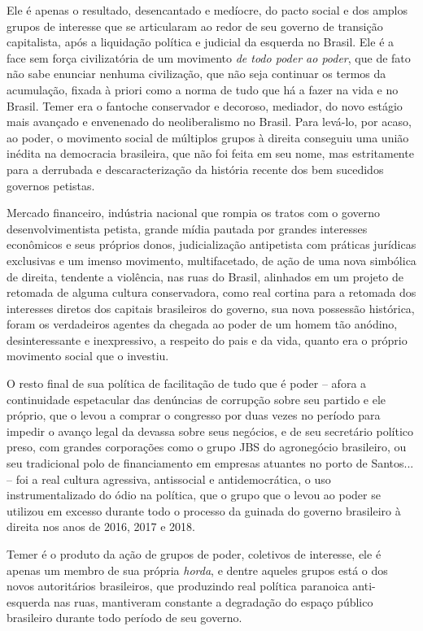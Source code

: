 Ele é apenas o resultado, desencantado e medíocre, do pacto social e dos
amplos grupos de interesse que se articularam ao redor de seu governo de
transição capitalista, após a liquidação política e judicial da esquerda
no Brasil. Ele é a face sem força civilizatória de um movimento \emph{de
todo poder ao poder}, que de fato não sabe enunciar nenhuma civilização,
que não seja continuar os termos da acumulação, fixada à priori como a
norma de tudo que há a fazer na vida e no Brasil. Temer era o fantoche
conservador e decoroso, mediador, do novo estágio mais avançado e
envenenado do neoliberalismo no Brasil. Para levá-lo, por acaso, ao
poder, o movimento social de múltiplos grupos à direita conseguiu uma
união inédita na democracia brasileira, que não foi feita em seu nome,
mas estritamente para a derrubada e descaracterização da história
recente dos bem sucedidos governos petistas.

Mercado financeiro, indústria nacional que rompia os tratos com o
governo desenvolvimentista petista, grande mídia pautada por grandes
interesses econômicos e seus próprios donos, judicialização antipetista
com práticas jurídicas exclusivas e um imenso movimento, multifacetado,
de ação de uma nova simbólica de direita, tendente a violência, nas ruas
do Brasil, alinhados em um projeto de retomada de alguma cultura
conservadora, como real cortina para a retomada dos interesses diretos
dos capitais brasileiros do governo, sua nova possessão histórica, foram
os verdadeiros agentes da chegada ao poder de um homem tão anódino,
desinteressante e inexpressivo, a respeito do pais e da vida, quanto era
o próprio movimento social que o investiu.

O resto final de sua política de facilitação de tudo que é poder --
afora a continuidade espetacular das denúncias de corrupção sobre seu
partido e ele próprio, que o levou a comprar o congresso por duas vezes
no período para impedir o avanço legal da devassa sobre seus negócios, e
de seu secretário político preso, com grandes corporações como o grupo
JBS do agronegócio brasileiro, ou seu tradicional polo de financiamento
em empresas atuantes no porto de Santos... -- foi a real cultura
agressiva, antissocial e antidemocrática, o uso instrumentalizado do
ódio na política, que o grupo que o levou ao poder se utilizou em
excesso durante todo o processo da guinada do governo brasileiro à
direita nos anos de 2016, 2017 e 2018.

Temer é o produto da ação de grupos de poder, coletivos de interesse,
ele é apenas um membro de sua própria \emph{horda}, e dentre aqueles
grupos está o dos novos autoritários brasileiros, que produzindo real
política paranoica anti-esquerda nas ruas, mantiveram constante a
degradação do espaço público brasileiro durante todo período de seu
governo.

